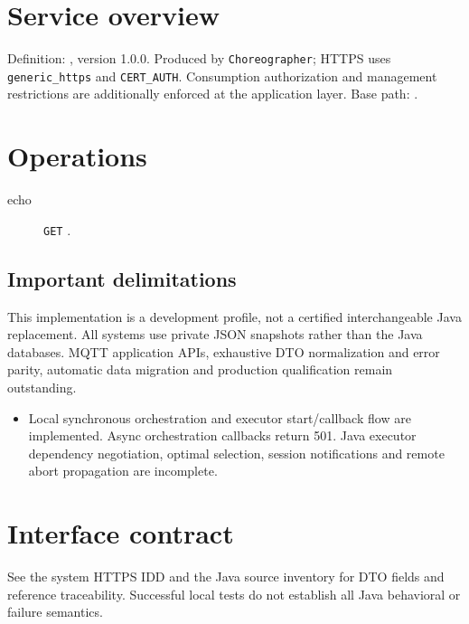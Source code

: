 \documentclass[a4paper]{arrowhead}
\begin{document}
\ArrowheadSetup
\section{Service overview}
Definition: , version 1.0.0. Produced by \texttt{Choreographer}; HTTPS uses \texttt{generic\_https} and \texttt{CERT\_AUTH}. Consumption authorization and management restrictions are additionally enforced at the application layer. Base path: .
\section{Operations}
\begin{description}
\item[echo] \texttt{GET} .
\end{description}
\subsection{Important delimitations}
This implementation is a development profile, not a certified interchangeable Java replacement. All systems use private JSON snapshots rather than the Java databases. MQTT application APIs, exhaustive DTO normalization and error parity, automatic data migration and production qualification remain outstanding.
\begin{itemize}
\item Local synchronous orchestration and executor start/callback flow are implemented. Async orchestration callbacks return 501. Java executor dependency negotiation, optimal selection, session notifications and remote abort propagation are incomplete.
\end{itemize}
\section{Interface contract}
See the system HTTPS IDD and the Java source inventory for DTO fields and reference traceability. Successful local tests do not establish all Java behavioral or failure semantics.
\end{document}
